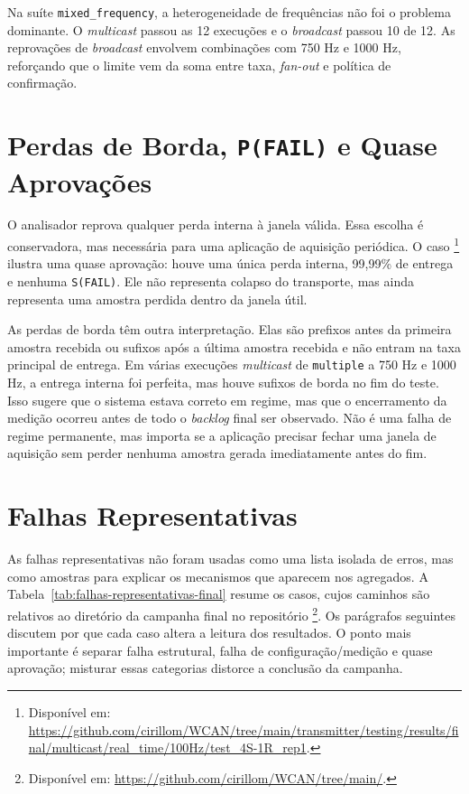 Na suíte \texttt{mixed\_frequency}, a heterogeneidade de frequências não foi o
problema dominante. O \emph{multicast} passou as 12 execuções e o \emph{broadcast} passou 10
de 12. As reprovações de \emph{broadcast} envolvem combinações com 750 Hz e 1000 Hz,
reforçando que o limite vem da soma entre taxa, \emph{fan-out} e política de
confirmação.

\section{Perdas de Borda, \texttt{P(FAIL)} e Quase Aprovações}

O analisador reprova qualquer perda interna à janela válida. Essa escolha é
conservadora, mas necessária para uma aplicação de aquisição periódica. O caso
\footnote{Disponível em: \url{https://github.com/cirillom/WCAN/tree/main/transmitter/testing/results/final/multicast/real_time/100Hz/test_4S-1R_rep1}.} ilustra uma quase aprovação:
houve uma única perda interna, 99,99\% de entrega e nenhuma \texttt{S(FAIL)}.
Ele não representa colapso do transporte, mas ainda representa uma amostra
perdida dentro da janela útil.

As perdas de borda têm outra interpretação. Elas são prefixos antes da primeira
amostra recebida ou sufixos após a última amostra recebida e não entram na taxa
principal de entrega. Em várias execuções \emph{multicast} de \texttt{multiple} a 750 Hz
e 1000 Hz, a entrega interna foi perfeita, mas houve sufixos de borda no fim do
teste. Isso sugere que o sistema estava correto em regime, mas que o encerramento
da medição ocorreu antes de todo o \emph{backlog} final ser observado. Não é uma falha
de regime permanente, mas importa se a aplicação precisar fechar uma janela de
aquisição sem perder nenhuma amostra gerada imediatamente antes do fim.

\section{Falhas Representativas}

As falhas representativas não foram usadas como uma lista isolada de erros, mas
como amostras para explicar os mecanismos que aparecem nos agregados. A
Tabela~\ref{tab:falhas-representativas-final} resume os casos, cujos caminhos
são relativos ao diretório da campanha final no repositório
\footnote{Disponível em: \url{https://github.com/cirillom/WCAN/tree/main/}.}.
Os parágrafos seguintes discutem por que cada caso altera a leitura dos resultados.
O ponto mais importante é separar falha estrutural, falha de configuração/medição
e quase aprovação; misturar essas categorias distorce a conclusão da campanha.

